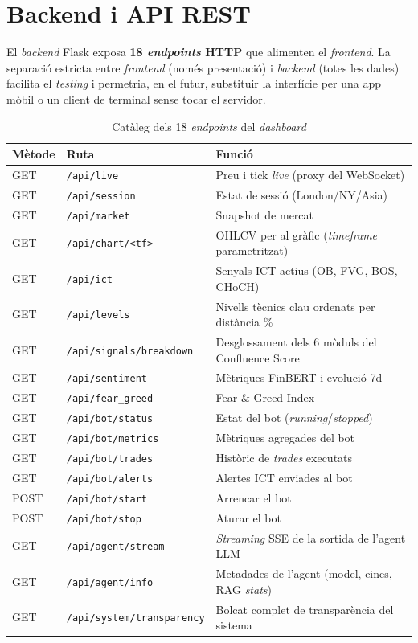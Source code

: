 \documentclass[12pt, a4paper]{report}
\begin{document}
\section{Backend i API REST}

El \textit{backend} Flask exposa \textbf{18 \textit{endpoints} HTTP} que alimenten el \textit{frontend}. La separació estricta entre \textit{frontend} (només presentació) i \textit{backend} (totes les dades) facilita el \textit{testing} i permetria, en el futur, substituir la interfície per una app mòbil o un client de terminal sense tocar el servidor.

\begin{table}[H]
\centering
\caption{Catàleg dels 18 \textit{endpoints} del \textit{dashboard}}
\label{tab:endpoints}
\begin{tabular}{@{}L{1.2cm}L{5.8cm}L{6cm}@{}}
\toprule
\textbf{Mètode} & \textbf{Ruta} & \textbf{Funció} \\
\midrule
GET  & \texttt{/api/live}                  & Preu i tick \textit{live} (proxy del WebSocket) \\
GET  & \texttt{/api/session}               & Estat de sessió (London/NY/Asia) \\
GET  & \texttt{/api/market}                & Snapshot de mercat \\
GET  & \texttt{/api/chart/<tf>}            & OHLCV per al gràfic (\textit{timeframe} parametritzat) \\
GET  & \texttt{/api/ict}                   & Senyals ICT actius (OB, FVG, BOS, CHoCH) \\
GET  & \texttt{/api/levels}                & Nivells tècnics clau ordenats per distància \% \\
GET  & \texttt{/api/signals/breakdown}     & Desglossament dels 6 mòduls del Confluence Score \\
GET  & \texttt{/api/sentiment}             & Mètriques FinBERT i evolució 7d \\
GET  & \texttt{/api/fear\_greed}           & Fear \& Greed Index \\
GET  & \texttt{/api/bot/status}            & Estat del bot (\textit{running}/\textit{stopped}) \\
GET  & \texttt{/api/bot/metrics}           & Mètriques agregades del bot \\
GET  & \texttt{/api/bot/trades}            & Històric de \textit{trades} executats \\
GET  & \texttt{/api/bot/alerts}            & Alertes ICT enviades al bot \\
POST & \texttt{/api/bot/start}             & Arrencar el bot \\
POST & \texttt{/api/bot/stop}              & Aturar el bot \\
GET  & \texttt{/api/agent/stream}          & \textit{Streaming} SSE de la sortida de l'agent LLM \\
GET  & \texttt{/api/agent/info}            & Metadades de l'agent (model, eines, RAG \textit{stats}) \\
GET  & \texttt{/api/system/transparency}   & Bolcat complet de transparència del sistema \\
\bottomrule
\end{tabular}
\end{table}
\end{document}
